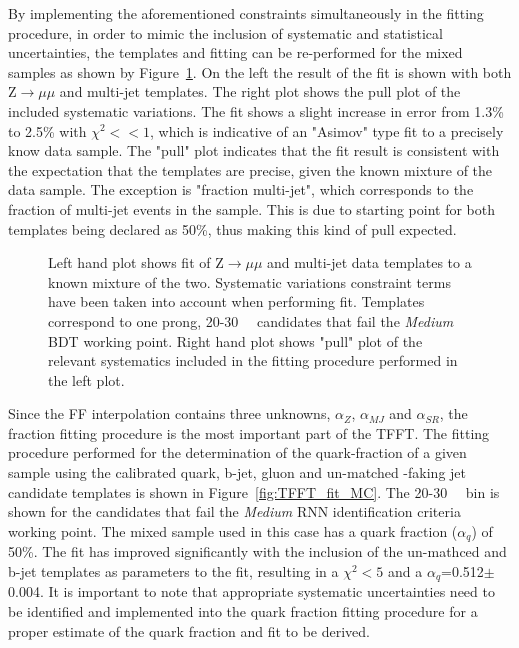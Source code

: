 	By implementing the aforementioned constraints simultaneously in the fitting procedure, in order to mimic the inclusion of systematic and statistical uncertainties, the templates and fitting can be re-performed for the mixed samples as shown by Figure~\ref{fig:TFFT_test_alphaMJ_unc}. 
	On the left the result of the fit is shown with both Z$\rightarrow\mu\mu$ and multi-jet templates. The right plot shows the pull plot of the included systematic variations. 
	The fit shows a slight increase in error from 1.3\% to 2.5\% with $\chi^2<<1$, which is indicative of an "Asimov" type fit to a precisely know data sample. 
	The "pull" plot indicates that the fit result is consistent with the expectation that the templates are precise, given the known mixture of the data sample.
	 The exception is "fraction multi-jet", which corresponds to the fraction of multi-jet events in the sample. This is due to starting point for both templates being declared as 50\%, thus making this kind of pull expected. 
	 
	\begin{figure}[!hbt]
	\begin{center}
	\hspace{0.03\textwidth}
	\hspace{0.03\textwidth}
	\end{center}
	\caption{Left hand plot shows fit of Z$\rightarrow\mu\mu$ and multi-jet data templates to a known mixture of the two. Systematic variations constraint terms have been taken into account when performing fit. Templates correspond to one prong, 20-30 \gev\ \htau\ candidates that fail the \textit{Medium} \ac{BDT} working point. Right hand plot shows "pull" plot of the relevant systematics included in the fitting procedure performed in the left plot.}
	\label{fig:TFFT_test_alphaMJ_unc}
	\end{figure}
	Since the \ac{FF} interpolation contains three unknowns, $\alpha_Z$, $\alpha_{MJ}$ and $\alpha_{SR}$, the fraction fitting procedure is the most important part of the \ac{TFFT}.
	 The fitting procedure performed for the determination of the quark-fraction of a given sample using the calibrated quark, b-jet, gluon and un-matched \htau -faking jet candidate templates is shown in Figure~\ref{fig:TFFT_fit_MC}. 
	 The 20-30 \gev\ \pt\ bin is shown for the candidates that fail the \textit{Medium} \ac{RNN} identification criteria working point. The mixed sample used in this case has a quark fraction ($\alpha_q$) of 50\%. 
	The fit has improved significantly with the inclusion of the un-mathced and b-jet templates as parameters to the fit, resulting in a $\chi^2 < 5$ and a $\alpha_q$=0.512$\pm$0.004.
	It is important to note that appropriate systematic uncertainties need to be identified and implemented into the quark fraction fitting procedure for a proper estimate of the quark fraction and fit to be derived.  
	
